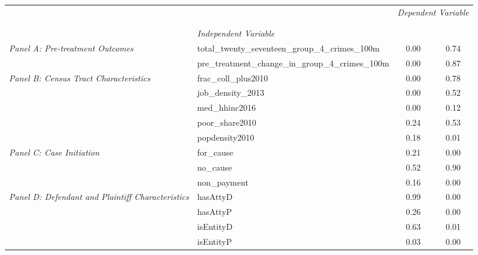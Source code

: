 \begin{tabular}{llcc}
\toprule
 &  & \multicolumn{2}{c}{\textit{Dependent Variable}} \\
\cline{3-4}
\\
 &  &  &  \\
 & \emph{Independent Variable} &  &  \\
\midrule
\multirow[c]{2}{3cm}{\textit{Panel A: Pre-treatment Outcomes}} & total_twenty_seventeen_group_4_crimes_100m & 0.00 & 0.74 \\
 & pre_treatment_change_in_group_4_crimes_100m & 0.00 & 0.87 \\
\cline{1-4}
\multirow[c]{5}{3cm}{\textit{Panel B: Census Tract Characteristics}} & frac_coll_plus2010 & 0.00 & 0.78 \\
 & job_density_2013 & 0.00 & 0.52 \\
 & med_hhinc2016 & 0.00 & 0.12 \\
 & poor_share2010 & 0.24 & 0.53 \\
 & popdensity2010 & 0.18 & 0.01 \\
\cline{1-4}
\multirow[c]{3}{3cm}{\textit{Panel C: Case Initiation}} & for_cause & 0.21 & 0.00 \\
 & no_cause & 0.52 & 0.90 \\
 & non_payment & 0.16 & 0.00 \\
\cline{1-4}
\multirow[c]{4}{3cm}{\textit{Panel D: Defendant and Plaintiff Characteristics}} & hasAttyD & 0.99 & 0.00 \\
 & hasAttyP & 0.26 & 0.00 \\
 & isEntityD & 0.63 & 0.01 \\
 & isEntityP & 0.03 & 0.00 \\
\cline{1-4}
\bottomrule
\end{tabular}

